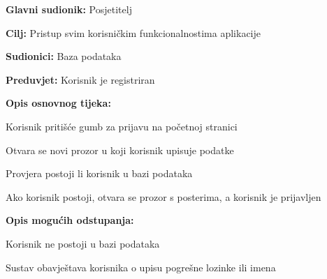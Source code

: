 					\noindent {}
					\begin{packed_item}
						
						\item \textbf{Glavni sudionik: } Posjetitelj
						\item  \textbf{Cilj:} Pristup svim korisničkim funkcionalnostima aplikacije
						\item  \textbf{Sudionici:} Baza podataka
						\item  \textbf{Preduvjet:} Korisnik je registriran
						\item  \textbf{Opis osnovnog tijeka:}
						
						\item[] \begin{packed_enum}
							
							\item Korisnik pritišće gumb za prijavu na početnoj stranici
							\item Otvara se novi prozor u koji korisnik upisuje podatke
							\item Provjera postoji li korisnik u bazi podataka
							\item Ako korisnik postoji, otvara se prozor s posterima, a korisnik je prijavljen
						\end{packed_enum}
						
						\item  \textbf{Opis mogućih odstupanja:}
						
						\item[] \begin{packed_item}
							
							\item[4.a] Korisnik ne postoji u bazi podataka
							\item[] \begin{packed_enum}
								
								\item Sustav obavještava korisnika o upisu pogrešne lozinke ili imena
								
							\end{packed_enum}
							
						\end{packed_item}
					\end{packed_item}	
					
